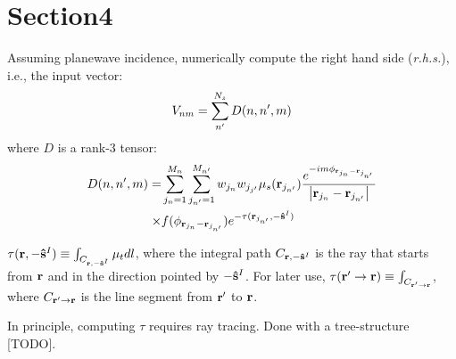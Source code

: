 \documentclass[main]{subfiles}
\begin{document}
\section{Section4}
\label{sec:Section4}
Assuming planewave incidence, numerically compute the right hand side 
(\textit{r.h.s.}), i.e., the input vector:
\begin{equation*} 
	V_{nm} = \sum\limits_{n^{\prime}}^{N_s} D(n,n^{\prime},m)
\end{equation*}
where $D$ is a rank-3 tensor:
\begin{equation*} \begin{split} 
	D(n,n^{\prime},m) =& \sum\limits_{j_n=1}^{M_n}
	\sum\limits_{j_{n^{\prime}}=1}^{M_{n^{\prime}}}
	w_{j_n}w_{j_{j^{\prime}}}\mu_s(\mathbf{r}_{j_{n^{\prime}}}) 
	\frac{e^{-i m\phi_{\mathbf{r}_{j_n}-\mathbf{r}_{j_{n^{\prime}}}}}}
	{\left| \mathbf{r}_{j_n}-\mathbf{r}_{j_{n^{\prime}}} \right|} \\ \times&
	f(\phi_{\mathbf{r}_{j_n}-\mathbf{r}_{j_{n^{\prime}}}})
	e^{-\tau(\mathbf{r}_{j_{n^{\prime}}},-\mathbf{\hat{s}}^I)}
\end{split} \end{equation*}

$\tau(\mathbf{r},-\mathbf{\hat{s}}^I)\equiv\int_{C_{\mathbf{r},-\mathbf{\hat{s}}^I}}\mu_t dl$, where the
integral path $C_{\mathbf{r},-\mathbf{\hat{s}}^I}$ is the ray that starts from $\mathbf{r}$ and in
the direction pointed by $-\mathbf{\hat{s}}^I$. For later use,
$\tau(\mathbf{r}^{\prime}\to\mathbf{r}) \equiv \int_{C_{\mathbf{r}^{\prime}\to\mathbf{r}}}$, where
$C_{\mathbf{r}^{\prime}\to\mathbf{r}}$ is the line segment from $\mathbf{r}^{\prime}$ to $\mathbf{r}$.

In principle, computing $\tau$ requires ray tracing. Done with a tree-structure
[TODO].
\end{document}
